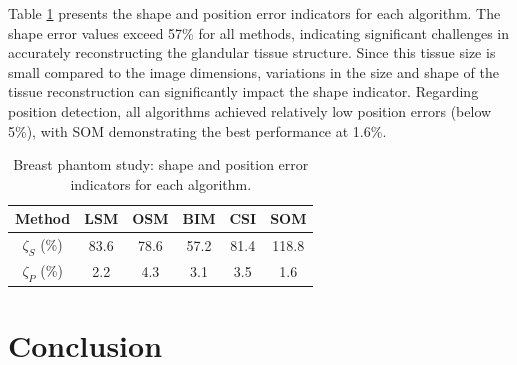 \documentclass{IEEEtran}
\begin{document}
            Table \ref{tab:breast:indicators} presents the shape and position error indicators for each algorithm. The shape error values exceed 57\% for all methods, indicating significant challenges in accurately reconstructing the glandular tissue structure. Since this tissue size is small compared to the image dimensions, variations in the size and shape of the tissue reconstruction can significantly impact the shape indicator. Regarding position detection, all algorithms achieved relatively low position errors (below 5\%), with SOM demonstrating the best performance at 1.6\%.

            \begin{table}[!htb]
                \centering
                \renewcommand{\arraystretch}{1.5}
                \caption{Breast phantom study: shape and position error indicators for each algorithm.}
                \label{tab:breast:indicators}
                \begin{tabular}{cccccc}
                    Method & LSM & OSM & BIM & CSI & SOM \\\hline %
                    $\zeta_S$ (\%) & 83.6 & 78.6 & 57.2 & 81.4 & 118.8 \\ %
                    $\zeta_P$ (\%) & 2.2 & 4.3 & 3.1 & 3.5 & 1.6 %
                \end{tabular}   
            \end{table}

    \section{Conclusion}\label{sec:conclusion}

\end{document}
